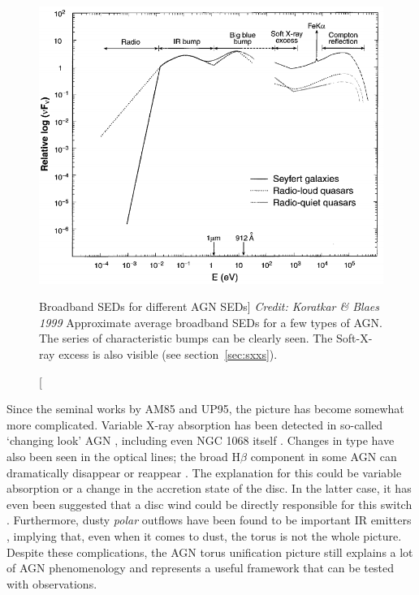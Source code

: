 \nocite{elvis1994}
\begin{figure}
\centering
\includegraphics[width=1.0\textwidth]{figures/01-intro/agn_sed.png}
\caption
[Broadband SEDs for different AGN SEDs]
{
{\sl Credit: Koratkar \& Blaes 1999}
Approximate average broadband SEDs for a few types of AGN. The series of 
characteristic bumps can be clearly seen. 
The Soft-X-ray excess is also visible
(see section~\ref{sec:sxxs}).
} 
\label{fig:quasar_sed}
\end{figure}

Since the seminal works by AM85 and UP95, 
the picture has become somewhat more complicated. 
Variable X-ray absorption has been detected in so-called `changing look'
AGN \citep{matt2003,puccetti2007}, 
including even NGC 1068 itself \citep{marinucci2016}.
Changes in type have also been seen in the optical lines;
the broad H$\beta$ component in some AGN can dramatically disappear or reappear
\citep[e.g.][]{tohline1976,cohen1986,denney2014}. 
The explanation for this could be variable absorption \citep{elitzur2012}
or a change in the accretion state of the disc. In the latter case,
it has even been suggested that a disc wind could be directly responsible
for this switch \citep{elitzur2014}.
Furthermore, dusty {\em polar} outflows
have been found to be important IR emitters \citep{hoenig2013}, implying
that, even when it comes to dust, the torus is not the whole picture.
Despite these complications, the AGN torus unification picture still
explains a lot of AGN phenomenology and represents a useful framework 
that can be tested with observations. 


